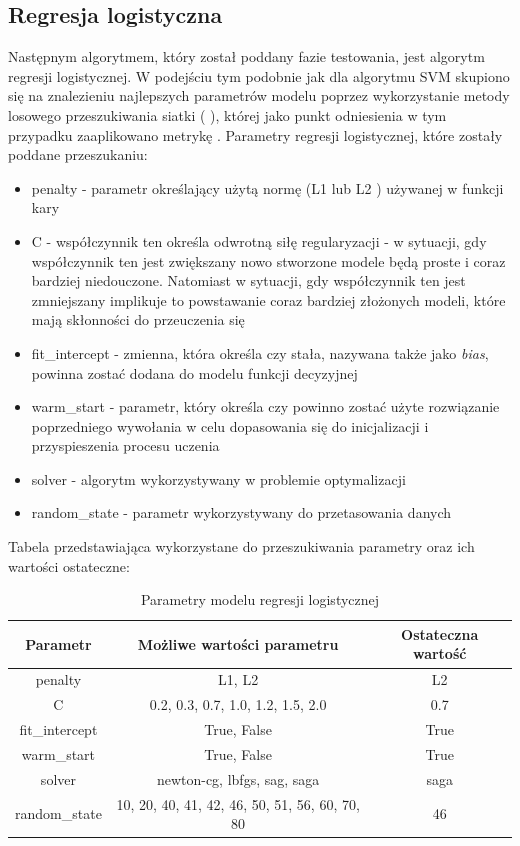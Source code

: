         \subsection{Regresja logistyczna}
        Następnym algorytmem, który został poddany fazie testowania, jest algorytm regresji logistycznej. W podejściu tym podobnie jak dla algorytmu SVM skupiono się na znalezieniu najlepszych parametrów modelu poprzez wykorzystanie metody losowego przeszukiwania siatki ( \cite{SKcv}), której jako punkt odniesienia w tym przypadku zaaplikowano metrykę  \cite{SKaccuracy}.
        Parametry regresji logistycznej, które zostały poddane przeszukaniu:\cite{SKLogRegression}
        \begin{itemize}
            \item penalty - parametr określający użytą normę (L1 lub L2 \cite{L1L2}) używanej w funkcji kary
            \item C - współczynnik ten określa odwrotną siłę regularyzacji - w sytuacji, gdy współczynnik ten jest zwiększany nowo stworzone modele będą proste i coraz bardziej niedouczone. Natomiast w sytuacji, gdy współczynnik ten jest zmniejszany implikuje to powstawanie coraz bardziej złożonych modeli, które mają skłonności do przeuczenia się
            \item fit\_intercept - zmienna, która określa czy stała, nazywana także jako \textit{bias}, powinna zostać dodana do modelu funkcji decyzyjnej
            \item warm\_start - parametr, który określa czy powinno zostać użyte rozwiązanie poprzedniego wywołania w celu dopasowania się do inicjalizacji i przyspieszenia procesu uczenia
            \item solver - algorytm wykorzystywany w problemie optymalizacji
            \item random\_state - parametr wykorzystywany do przetasowania danych
        \end{itemize}
        Tabela przedstawiająca wykorzystane do przeszukiwania parametry oraz ich wartości ostateczne:
        \begin{table}[H]
        \caption{Parametry modelu regresji logistycznej}
        \label{tab:params_lr}
        \centering
        \begin{tabular}{c c c}
        \toprule
            Parametr & Możliwe wartości parametru & Ostateczna wartość \\
        \midrule
            penalty & L1, L2 & L2 \\
            C & 0.2, 0.3, 0.7, 1.0, 1.2, 1.5, 2.0 & 0.7 \\
            fit\_intercept & True, False & True \\
            warm\_start & True, False & True \\
            solver & newton-cg, lbfgs, sag, saga & saga\\
            random\_state & 10, 20, 40, 41, 42, 46, 50, 51, 56, 60, 70, 80 & 46 \\
        \bottomrule
        \end{tabular}
        \end{table}
